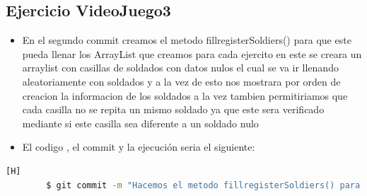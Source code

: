 \documentclass{article}
\begin{document}
	\subsection{Ejercicio VideoJuego3}
	\begin{itemize}	
		\item En el segundo commit creamos el metodo fillregisterSoldiers() para que este pueda llenar los ArrayList que creamos para cada ejercito en este se creara un arraylist con casillas de soldados con datos nulos el cual se va ir llenando aleatoriamente con soldados y a la vez de esto nos mostrara por orden de creacion la informacion de los soldados a la vez tambien permitiriamos que cada casilla no se repita un mismo soldado ya que este sera verificado mediante si este casilla sea diferente a un soldado nulo
		\item El codigo , el commit  y la ejecución seria el siguiente:
	\end{itemize}	
	\begin{lstlisting}[language=bash,caption={Commit}][H]
		$ git commit -m "Hacemos el metodo fillregisterSoldiers() para que este pueda llenar los ArrayList que creamos para cada ejercito en este se creara un arraylist con casillas de soldados con datos nulos el cual se va ir llenando aleatoriamente con soldados y a la vez de esto nos mostrara por orden de creacion la informacion de los soldados a la vez tambien permitiriamos que cada casilla no se repita un mismo soldado ya que este sera verificado mediante si este casilla sea diferente a un soldado nulo"
	\end{lstlisting}	
\end{document}
